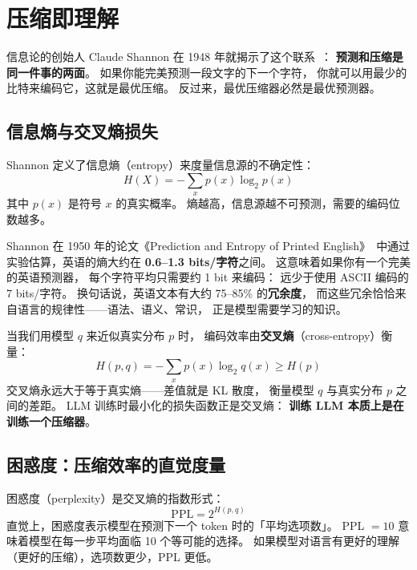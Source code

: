 \section{压缩即理解}

信息论的创始人 Claude Shannon 在 1948 年就揭示了这个联系~\cite{shannon1948}：
\textbf{预测和压缩是同一件事的两面}。
如果你能完美预测一段文字的下一个字符，
你就可以用最少的比特来编码它，这就是最优压缩。
反过来，最优压缩器必然是最优预测器。

\subsection{信息熵与交叉熵损失}

Shannon 定义了信息熵（entropy）来度量信息源的不确定性：
\begin{equation}
  H(X) = -\sum_{x} p(x) \log_2 p(x)
\end{equation}
其中 $p(x)$ 是符号 $x$ 的真实概率。
熵越高，信息源越不可预测，需要的编码位数越多。

Shannon 在 1950 年的论文《Prediction and Entropy of Printed English》~\cite{shannon1950}中通过实验估算，英语的熵大约在 \textbf{0.6--1.3 bits/字符}之间。
这意味着如果你有一个完美的英语预测器，
每个字符平均只需要约 1 bit 来编码：
远少于使用 ASCII 编码的 7 bits/字符。
换句话说，英语文本有大约 75--85\% 的\textbf{冗余度}，
而这些冗余恰恰来自语言的规律性——语法、语义、常识，
正是模型需要学习的知识。

当我们用模型 $q$ 来近似真实分布 $p$ 时，
编码效率由\textbf{交叉熵}（cross-entropy）衡量：
\begin{equation}
  H(p, q) = -\sum_{x} p(x) \log_2 q(x) \geq H(p)
\end{equation}
交叉熵永远大于等于真实熵——差值就是 KL 散度，
衡量模型 $q$ 与真实分布 $p$ 之间的差距。
LLM 训练时最小化的损失函数正是交叉熵：
\textbf{训练 LLM 本质上是在训练一个压缩器}。

\subsection{困惑度：压缩效率的直觉度量}

困惑度（perplexity）是交叉熵的指数形式：
\begin{equation}
  \mathrm{PPL} = 2^{H(p, q)}
\end{equation}
直觉上，困惑度表示模型在预测下一个 token 时的「平均选项数」。
PPL $= 10$ 意味着模型在每一步平均面临 10 个等可能的选择。
如果模型对语言有更好的理解（更好的压缩），选项数更少，PPL 更低。

